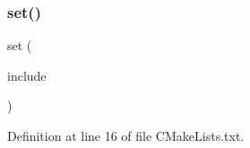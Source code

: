 \subsubsection{\texorpdfstring{set()}{set()}\hspace{0.1cm}{\footnotesize\ttfamily [3/3]}}
{\footnotesize\ttfamily set (\begin{DoxyParamCaption}\item[{I\+N\+C\+L\+U\+D\+E\+\_\+\+D\+IR ../}]{include }\end{DoxyParamCaption})}



Definition at line 16 of file C\+Make\+Lists.\+txt.


\begin{DoxyCode}{0}

\end{DoxyCode}
